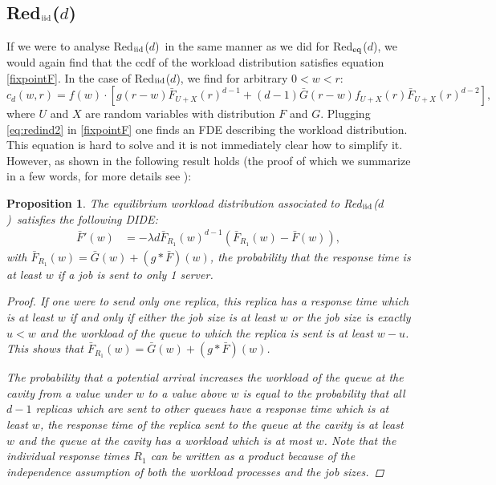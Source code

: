 \documentclass[12pt]{report}
\newcommand{\Redid}{Red$_{\textup{eq}}$($d$)}
\newcommand{\Redind}{Red$_{\textup{iid}}$($d$)}
\newtheorem{proposition}[theorem]{Proposition}
\begin{document}
\subsection{\Redind}
If we were to analyse \Redind\ in the same manner as we did for \Redid , we would again find that the ccdf of the workload distribution satisfies equation \eqref{fixpointF}. In the case of \Redind , we find for arbitrary $0<w<r$:
\begin{equation}\label{eq:redind2}
c_d(w,r)=f(w) \cdot \left[ g(r-w) \bar F_{U+X}(r)^{d-1} + (d-1) \bar G(r-w) f_{U+X}(r) \bar F_{U+X}(r)^{d-2} \right],
\end{equation}
where $U$ and $X$ are random variables with distribution $F$ and $G$. Plugging \eqref{eq:redind2} in \eqref{fixpointF} one finds an FDE describing the workload distribution. This equation is hard to solve and it is not immediately clear how to simplify it. However, as shown in \cite{gardnerOR} the following result holds (the proof of which we summarize in a few words, for more details see \cite{gardnerOR}):
\begin{proposition}\label{prop:gardner}
The equilibrium workload distribution associated to \Redind\ satisfies the following DIDE:
\begin{align}
\bar F'(w)
&=
-\lambda d \bar{F}_{R_1}(w)^{d-1} (\bar F_{R_1}(w) - \bar F (w)), \label{eq:ind_copies}
\end{align}
with $\bar{F}_{R_1}(w) = \bar{G}(w) + (g * \bar F)(w)$, the probability that the response time is at least $w$ if a job is sent to only 1 server.
\begin{proof}
If one were to send only one replica,  this replica has a response time which is at least $w$ if and only if either the job size is at least $w$ or the job size is exactly $u<w$ and the workload of the queue to which the replica is sent is at least $w-u$. This shows that $\bar F_{R_1}(w) = \bar G(w) + (g * \bar F)(w)$.

The probability that a potential arrival increases the workload of the queue at the cavity from a value under $w$ to a value above $w$ is equal to the probability that all $d-1$ replicas which are sent to other queues have a response time which is at least $w$, the response time of the replica sent to the queue at the cavity is at least $w$ and the queue at the cavity has a workload which is at most $w$. Note that the individual response times $R_1$ can be written as a product because of the independence assumption of both the workload processes and the job sizes.
\end{proof}
\end{proposition}
\end{document}
